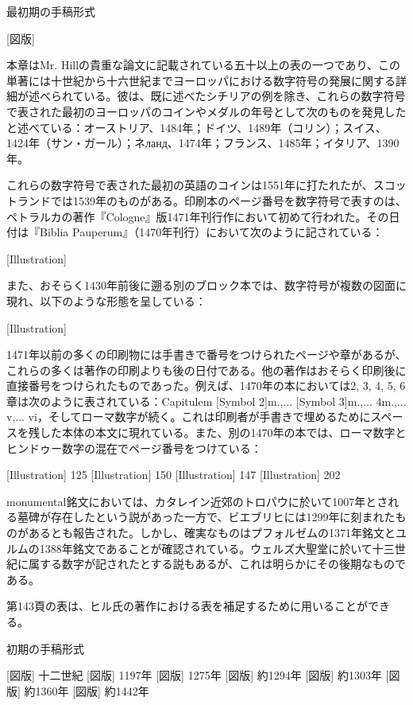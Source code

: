 \documentclass[a4paper,11pt,openany]{ltjsbook}
\begin{document}
最初期の手稿形式

[図版]

本章はMr. Hillの貴重な論文に記載されている五十以上の表の一つであり、この単著には十世紀から十六世紀までヨーロッパにおける数字符号の発展に関する詳細が述べられている。彼は、既に述べたシチリアの例を除き、これらの数字符号で表された最初のヨーロッパのコインやメダルの年号として次のものを発見したと述べている：オーストリア、1484年；ドイツ、1489年（コリン）；スイス、1424年（サン・ガール）；ネланд、1474年；フランス、1485年；イタリア、1390年。

これらの数字符号で表された最初の英語のコインは1551年に打たれたが、スコットランドでは1539年のものがある。印刷本のページ番号を数字符号で表すのは、ペトラルカの著作『Cologne』版1471年刊行作において初めて行われた。その日付は『Biblia Pauperum』（1470年刊行）において次のように記されている：

[Illustration]

また、おそらく1430年前後に遡る別のブロック本では、数字符号が複数の図面に現れ、以下のような形態を呈している：

[Illustration]

1471年以前の多くの印刷物には手書きで番号をつけられたページや章があるが、これらの多くは著作の印刷よりも後の日付である。他の著作はおそらく印刷後に直接番号をつけられたものであった。例えば、1470年の本においては2, 3, 4, 5, 6章は次のように表されている：Capitulem [Symbol 2]m.,... [Symbol 3]m.,... 4m.,... v,... vi，そしてローマ数字が続く。これは印刷者が手書きで埋めるためにスペースを残した本体の本文に現れている。また、別の1470年の本では、ローマ数字とヒンドゥー数字の混在でページ番号をつけている：

[Illustration] 125      [Illustration] 150
  [Illustration] 147      [Illustration] 202

monumental銘文においては、カタレイン近郊のトロパウに於いて1007年とされる墓碑が存在したという説があった一方で、ビエブリヒには1299年に刻まれたものがあるとも報告された。しかし、確実なものはプフォルゼムの1371年銘文とユルムの1388年銘文であることが確認されている。ウェルズ大聖堂に於いて十三世紀に属する数字が記されたとする説もあるが、これは明らかにその後期なものである。

第143頁の表は、ヒル氏の著作における表を補足するために用いることができる。



初期の手稿形式

 [図版] 十二世紀
   [図版] 1197年
   [図版] 1275年
   [図版] 約1294年
   [図版] 約1303年
   [図版] 約1360年
   [図版] 約1442年
\end{document}
